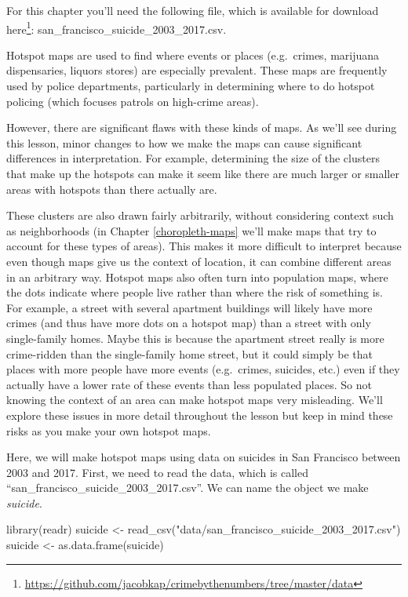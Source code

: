 \documentclass[
]{krantz}
\makeatletter
\newenvironment{Shaded}{\begin{snugshade}}{\end{snugshade}}
\newcommand{\FunctionTok}[1]{\textcolor[rgb]{0,0,0}{#1}}
\newcommand{\NormalTok}[1]{#1}
\newcommand{\OtherTok}[1]{\textcolor[rgb]{0.37,0.37,0.37}{#1}}
\newcommand{\StringTok}[1]{\textcolor[rgb]{0.5,0.5,0.5}{#1}}
\renewcommand{\href}[2]{#2\footnote{\url{#1}}}
\newenvironment{kframe}{%
\medskip{}
\setlength{\fboxsep}{.8em}
 \def\at@end@of@kframe{}%
 \ifinner\ifhmode%
  \def\at@end@of@kframe{\end{minipage}}%
  \begin{minipage}{\columnwidth}%
 \fi\fi%
 \def\FrameCommand##1{\hskip\@totalleftmargin \hskip-\fboxsep
 \colorbox{shadecolor}{##1}\hskip-\fboxsep
     \hskip-\linewidth \hskip-\@totalleftmargin \hskip\columnwidth}%
 \MakeFramed {\advance\hsize-\width
   \@totalleftmargin\z@ \linewidth\hsize
   \@setminipage}}%
 {\par\unskip\endMakeFramed%
 \at@end@of@kframe}
\renewenvironment{Shaded}{\begin{kframe}}{\end{kframe}}
\makeatother
\begin{document}
For this chapter you'll need the following file, which is
available for download
\href{https://github.com/jacobkap/crimebythenumbers/tree/master/data}{here}:
san\_francisco\_suicide\_2003\_2017.csv.

Hotspot maps are used to find where events or places
(e.g.~crimes, marijuana dispensaries, liquors stores) are
especially prevalent. These maps are frequently used by
police departments, particularly in determining where to do
hotspot policing (which focuses patrols on high-crime
areas).

However, there are significant flaws with these kinds of
maps. As we'll see during this lesson, minor changes to how
we make the maps can cause significant differences in
interpretation. For example, determining the size of the
clusters that make up the hotspots can make it seem like
there are much larger or smaller areas with hotspots than
there actually are.

These clusters are also drawn fairly arbitrarily, without
considering context such as neighborhoods (in Chapter
\ref{choropleth-maps} we'll make maps that try to account
for these types of areas). This makes it more difficult to
interpret because even though maps give us the context of
location, it can combine different areas in an arbitrary
way. Hotspot maps also often turn into population maps,
where the dots indicate where people live rather than where
the risk of something is. For example, a street with several
apartment buildings will likely have more crimes (and thus
have more dots on a hotspot map) than a street with only
single-family homes. Maybe this is because the apartment
street really is more crime-ridden than the single-family
home street, but it could simply be that places with more
people have more events (e.g.~crimes, suicides, etc.) even
if they actually have a lower rate of these events than less
populated places. So not knowing the context of an area can
make hotspot maps very misleading. We'll explore these
issues in more detail throughout the lesson but keep in mind
these risks as you make your own hotspot maps.

Here, we will make hotspot maps using data on suicides in
San Francisco between 2003 and 2017. First, we need to read
the data, which is called
``san\_francisco\_suicide\_2003\_2017.csv''. We can name the
object we make \emph{suicide}.

\begin{Shaded}
\begin{Highlighting}[]
\FunctionTok{library}\NormalTok{(readr)}
\NormalTok{suicide }\OtherTok{\textless{}{-}} \FunctionTok{read\_csv}\NormalTok{(}\StringTok{"data/san\_francisco\_suicide\_2003\_2017.csv"}\NormalTok{)}
\NormalTok{suicide }\OtherTok{\textless{}{-}} \FunctionTok{as.data.frame}\NormalTok{(suicide)}
\end{Highlighting}
\end{Shaded}
\end{document}

